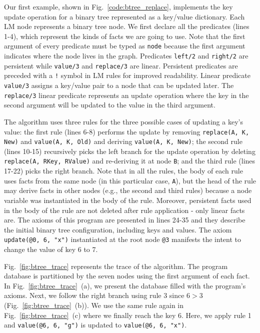 Our first example, shown in Fig.~\ref{code:btree_replace}, implements the key
update operation for a binary tree represented as a key/value dictionary. Each
LM node represents a binary tree node.  We first declare all the predicates
(lines 1-4), which represent the kinds of facts we are going to use. Note that
the first argument of every predicate must be typed as \texttt{node} because the
first argument indicates where the node lives in the graph. Predicates
\texttt{left/2} and \texttt{right/2} are persistent while \texttt{value/3} and
\texttt{replace/3} are linear. Persistent predicates are preceded with a
\texttt{!} symbol in LM rules for improved readability. Linear predicate \texttt{value/3} assigns a
key/value pair to a node that can be updated later. The \texttt{replace/3}
linear predicate represents an update operation where the key in the second
argument will be updated to the value in the third argument.

The algorithm uses three rules for the three possible cases of updating a key's
value: the first rule (lines 6-8) performs the update by removing
\texttt{replace(A, K, New)} and \texttt{value(A, K, Old)} and deriving
\texttt{value(A, K, New)}; the second rule (lines 10-15) recursively picks the
left branch for the update operation by deleting \texttt{replace(A, RKey,
RValue)} and re-deriving it at node \texttt{B}; and the third rule (lines
17-22) picks the right branch. Note that in all the rules, the body of
each rule uses facts from the same node (in this particular case,
\texttt{A}), but the head of the rule may derive facts in other
nodes (e.g., the second and third rules) because a node variable was
instantiated in the body of the rule. Moreover, persistent facts used in
the body of the rule are not deleted after rule application - only linear
facts are. The axioms of this program are presented in lines 24-35 and
they describe the initial binary tree configuration, including keys and
values.  The axiom \texttt{update(@0, 6, "x")} instantiated at the root
node \texttt{@3} manifests the intent to change the value of key 6 to 7.

Fig.~\ref{fig:btree_trace} represents the trace of the algorithm. The program
database is partitioned by the seven nodes using the first argument of each
fact. In Fig.~\ref{fig:btree_trace}~(a), we present the database filled with the
program's axioms. Next, we follow the right branch using rule 3 since $6 > 3$
(Fig.~\ref{fig:btree_trace}~(b)).  We use the same rule again in
Fig.~\ref{fig:btree_trace}~(c) where we finally reach the key 6. Here, we apply
rule 1 and \texttt{value(@6, 6, "g")} is updated to \texttt{value(@6, 6, "x")}.

